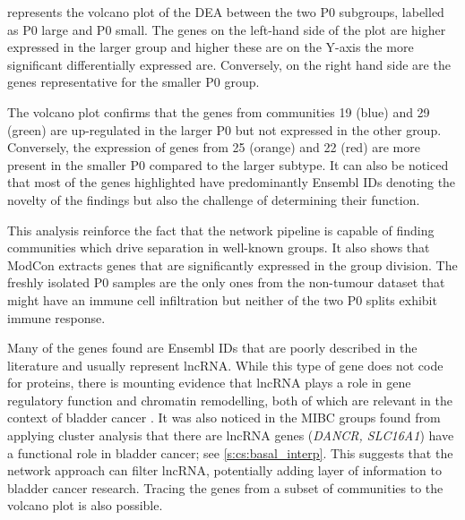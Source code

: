  represents the volcano plot of the DEA between the two P0 subgroups, labelled as P0 large and P0 small. The genes on the left-hand side of the plot are higher expressed in the larger group and higher these are on the Y-axis the more significant differentially expressed are. Conversely, on the right hand side are the genes representative for the smaller P0 group.

The volcano plot confirms that the genes from communities 19 (blue) and 29 (green) are up-regulated in the larger P0 but not expressed in the other group. Conversely, the expression of genes from 25 (orange) and 22 (red) are more present in the smaller P0 compared to the larger subtype. It can also be noticed that most of the genes highlighted have predominantly Ensembl IDs denoting the novelty of the findings but also the challenge of determining their function. 

This analysis reinforce the fact that the network pipeline is capable of finding communities which drive separation in well-known groups. It also shows that ModCon extracts genes that are significantly expressed in the group division. The freshly isolated P0 samples are the only ones from the non-tumour dataset that might have an immune cell infiltration but neither of the two P0 splits exhibit immune response. 

Many of the genes found are Ensembl IDs that are poorly described in the literature and usually represent \acrfull{lncRNA}. While this type of gene does not code for proteins, there is mounting evidence that lncRNA plays a role in gene regulatory function and chromatin remodelling, both of which are relevant in the context of bladder cancer \citep{Statello2021-md}. It was also noticed in the MIBC groups found from applying cluster analysis that there are \acrlong{lncRNA} genes (\textit{DANCR, SLC16A1}) have a functional role in bladder cancer; see \cref{s:cs:basal_interp}. This suggests that the network approach can filter lncRNA, potentially adding layer of information to bladder cancer research. Tracing the genes from a subset of communities to the volcano plot is also possible.

